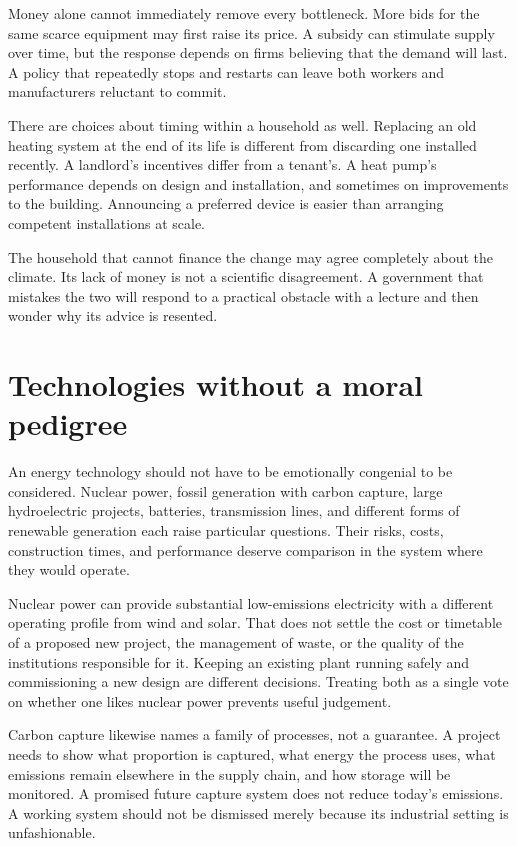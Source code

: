 \documentclass[12pt,a4paper]{book}
\begin{document}
Money alone cannot immediately remove every bottleneck. More bids for the same scarce equipment may first raise its price. A subsidy can stimulate supply over time, but the response depends on firms believing that the demand will last. A policy that repeatedly stops and restarts can leave both workers and manufacturers reluctant to commit.

There are choices about timing within a household as well. Replacing an old heating system at the end of its life is different from discarding one installed recently. A landlord's incentives differ from a tenant's. A heat pump's performance depends on design and installation, and sometimes on improvements to the building. Announcing a preferred device is easier than arranging competent installations at scale.

The household that cannot finance the change may agree completely about the climate. Its lack of money is not a scientific disagreement. A government that mistakes the two will respond to a practical obstacle with a lecture and then wonder why its advice is resented.

\section*{Technologies without a moral pedigree}

An energy technology should not have to be emotionally congenial to be considered. Nuclear power, fossil generation with carbon capture, large hydroelectric projects, batteries, transmission lines, and different forms of renewable generation each raise particular questions. Their risks, costs, construction times, and performance deserve comparison in the system where they would operate.

Nuclear power can provide substantial low-emissions electricity with a different operating profile from wind and solar. That does not settle the cost or timetable of a proposed new project, the management of waste, or the quality of the institutions responsible for it. Keeping an existing plant running safely and commissioning a new design are different decisions. Treating both as a single vote on whether one likes nuclear power prevents useful judgement.

Carbon capture likewise names a family of processes, not a guarantee. A project needs to show what proportion is captured, what energy the process uses, what emissions remain elsewhere in the supply chain, and how storage will be monitored. A promised future capture system does not reduce today's emissions. A working system should not be dismissed merely because its industrial setting is unfashionable.
\end{document}
